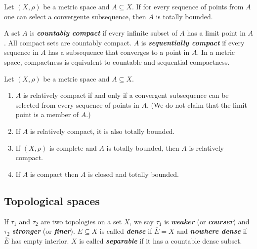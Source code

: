 \documentclass{article}
\theoremstyle{definition}
\begin{document}
	\begin{thm}
		Let $(X,\rho)$ be a metric space and $A\subseteq X$. If for every sequence of points from $A$ one can select a convergente subsequence, then $A$ is totally bounded.
	\end{thm}
	A set $A$ is \textbf{\textit{countably compact}} if every infinite subset of $A$ has a limit point in $A$. All compact sets are countably compact. $A$ is \textbf{\textit{sequentially compact}} if every sequence in $A$ has a subsequence that converges to a point in $A$. In a metric space, compactness is equivalent to countable and sequential compactness.
	
	\begin{thm} Let $(X,\rho)$ be a metric space and $A\subseteq X$.
		\begin{enumerate}
			\item $A$ is relatively compact if and only if a convergent subsequence can be selected from every sequence of points in $A$. (We do not claim that the limit point is a member of $A$.)
			\item If $A$ is relatively compact, it is also totally bounded.
			\item If $(X,\rho)$ is complete and $A$ is totally bounded, then $A$ is relatively compact.
			\item If $A$ is compact then $A$ is closed and totally bounded.
		\end{enumerate}
	\end{thm}
	
	\subsection{Topological spaces} If $\tau_1$ and $\tau_2$ are two topologies on a set $X$, we say $\tau_1$ is \textbf{\textit{weaker}} (or \textbf{\textit{coarser}}) and $\tau_2$ \textbf{\textit{stronger}} (or \textbf{\textit{finer}}). $E\subseteq X$ is called \textbf{\textit{dense}} if $\overline{E}=X$ and \textbf{\textit{nowhere dense}} if $\overline{E}$ has empty interior. $X$ is called \textbf{\textit{separable}} if it has a countable dense subset. 
	
\end{document}
